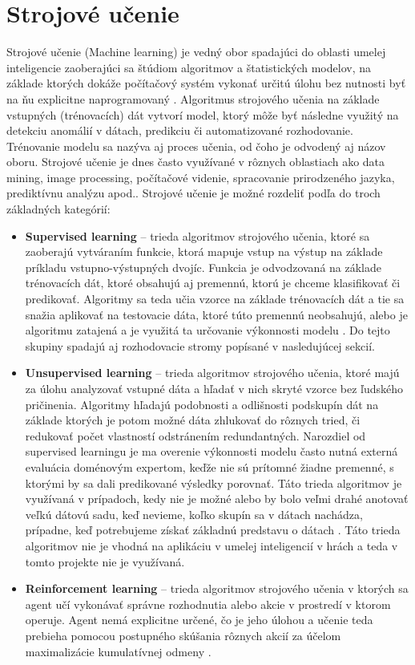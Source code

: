 \documentclass[slovak, master]{diploma}
\begin{document}
\chapter{Strojové učenie}
\label{sec:MachineLearningOverview}
Strojové učenie (Machine learning) je vedný obor spadajúci do oblasti umelej inteligencie zaoberajúci sa štúdiom algoritmov a štatistických modelov, na základe ktorých dokáže počítačový systém vykonať určitú úlohu bez nutnosti byť na ňu explicitne naprogramovaný \cite{mahesh2020machine}. Algoritmus strojového učenia na základe vstupných (trénovacích) dát vytvorí model, ktorý môže byť následne využitý na detekciu anomálií v dátach, predikciu či automatizované rozhodovanie. Trénovanie modelu sa nazýva aj proces učenia, od čoho je odvodený aj názov oboru. Strojové učenie je dnes často využívané v rôznych oblastiach ako data mining, image processing, počítačové videnie, spracovanie prirodzeného jazyka, prediktívnu analýzu apod.\cite{zhou2021machine}.
Strojové učenie je možné rozdeliť podľa do troch základných kategórií: %
\begin{itemize}
  \item \textbf{Supervised learning} -- trieda algoritmov strojového učenia, ktoré sa zaoberajú vytváraním funkcie, ktorá mapuje vstup na výstup na základe príkladu vstupno-výstupných dvojíc. Funkcia je odvodzovaná na základe trénovacích dát, ktoré obsahujú aj premennú, ktorú je chceme klasifikovať či predikovať. Algoritmy sa teda učia vzorce na základe trénovacích dát a tie sa snažia aplikovať na testovacie dáta, ktoré túto premennú neobsahujú, alebo je algoritmu zatajená a je využitá ta určovanie výkonnosti modelu \cite{mahesh2020machine}. Do tejto skupiny spadajú aj rozhodovacie stromy popísané v nasledujúcej sekcií.
  \item \textbf{Unsupervised learning} -- trieda algoritmov strojového učenia, ktoré majú za úlohu analyzovať vstupné dáta a hľadať v nich skryté vzorce bez ľudského pričinenia. Algoritmy hľadajú podobnosti a odlišnosti podskupín dát na základe ktorých je potom možné dáta zhlukovať do rôznych tried, či redukovať počet vlastností odstránením redundantných. Narozdiel od supervised learningu je ma overenie výkonnosti modelu často nutná externá evaluácia doménovým expertom, keďže nie sú prítomné žiadne premenné, s ktorými by sa dali predikované výsledky porovnať. Táto trieda algoritmov je využívaná v prípadoch, kedy nie je možné alebo by bolo veľmi drahé anotovať veľkú dátovú sadu, keď nevieme, koľko skupín sa v dátach nachádza, prípadne, keď potrebujeme získať základnú predstavu o dátach \cite{Unsupervised}. Táto trieda algoritmov nie je vhodná na aplikáciu v umelej inteligencií v hrách a teda v tomto projekte nie je využívaná.
  \item \textbf{Reinforcement learning} -- trieda algoritmov strojového učenia v ktorých sa agent učí vykonávať správne rozhodnutia alebo akcie v prostredí v ktorom operuje. Agent nemá explicitne určené, čo je jeho úlohou a učenie teda prebieha pomocou postupného skúšania rôznych akcií za účelom maximalizácie kumulatívnej odmeny \cite{reinforcementLearning}.
\end{itemize}
\end{document}
